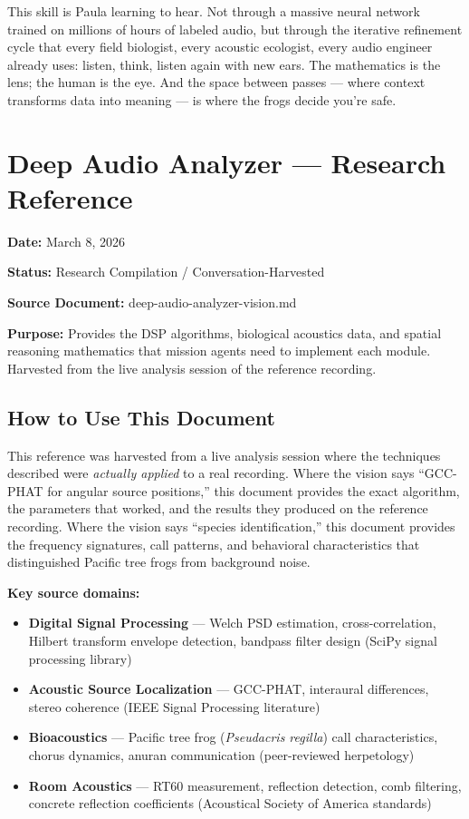 \documentclass[11pt,letterpaper]{article}
\newcommand{\stageheader}[2]{%
  \noindent\colorbox{#2}{\makebox[\textwidth][l]{%
    \textcolor{white}{\bfseries\sffamily\hspace{6pt}#1\hspace{6pt}}}}%
  \vspace{0.5em}\par%
}
\newcommand{\metafield}[2]{\textbf{\sffamily #1} #2\par}
\begin{document}
This skill is Paula learning to hear. Not through a massive neural network trained on millions of hours of labeled audio, but through the iterative refinement cycle that every field biologist, every acoustic ecologist, every audio engineer already uses: listen, think, listen again with new ears. The mathematics is the lens; the human is the eye. And the space between passes --- where context transforms data into meaning --- is where the frogs decide you're safe.

\newpage

\stageheader{STAGE 2 --- RESEARCH REFERENCE}{secondary}

\section{Deep Audio Analyzer --- Research Reference}

\metafield{Date:}{March 8, 2026}
\metafield{Status:}{Research Compilation / Conversation-Harvested}
\metafield{Source Document:}{deep-audio-analyzer-vision.md}
\metafield{Purpose:}{Provides the DSP algorithms, biological acoustics data, and spatial reasoning mathematics that mission agents need to implement each module. Harvested from the live analysis session of the reference recording.}

\subsection{How to Use This Document}

This reference was harvested from a live analysis session where the techniques described were \textit{actually applied} to a real recording. Where the vision says ``GCC-PHAT for angular source positions,'' this document provides the exact algorithm, the parameters that worked, and the results they produced on the reference recording. Where the vision says ``species identification,'' this document provides the frequency signatures, call patterns, and behavioral characteristics that distinguished Pacific tree frogs from background noise.

\textbf{Key source domains:}

\begin{itemize}[leftmargin=2em]
\item \textbf{Digital Signal Processing} --- Welch PSD estimation, cross-correlation, Hilbert transform envelope detection, bandpass filter design (SciPy signal processing library)
\item \textbf{Acoustic Source Localization} --- GCC-PHAT, interaural differences, stereo coherence (IEEE Signal Processing literature)
\item \textbf{Bioacoustics} --- Pacific tree frog (\textit{Pseudacris regilla}) call characteristics, chorus dynamics, anuran communication (peer-reviewed herpetology)
\item \textbf{Room Acoustics} --- RT60 measurement, reflection detection, comb filtering, concrete reflection coefficients (Acoustical Society of America standards)
\end{itemize}
\end{document}
